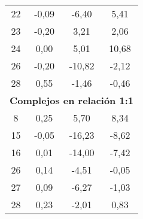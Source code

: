 \begin{table}[h]
\begin{tabular}{cccc}
22               & -0,09        & -6,40                & 5,41                  \\
23               & -0,20        & 3,21                 & 2,06                  \\
24               & 0,00         & 5,01                 & 10,68                 \\
26               & -0,20        & -10,82               & -2,12                 \\
28               & 0,55         & -1,46                & -0,46                 \\ \hline
\multicolumn{4}{c}{\textbf{Complejos en relación 1:1}}                         \\ \hline
8                & 0,25         & 5,70                 & 8,34                  \\
15               & -0,05        & -16,23               & -8,62                 \\
16               & 0,01         & -14,00               & -7,42                 \\
26               & 0,14         & -4,51                & -0,05                 \\
27               & 0,09         & -6,27                & -1,03                 \\
28               & 0,23         & -2,01                & 0,83                  \\ \hline
\end{tabular}
\end{table}

\clearpage

